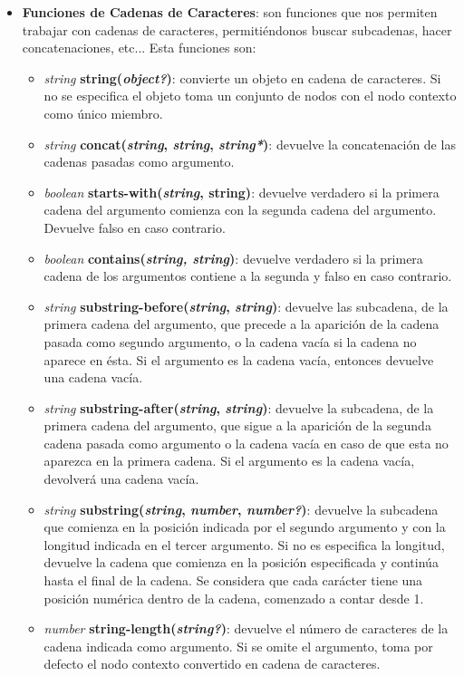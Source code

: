 \begin{itemize}
    \item \textbf{Funciones de Cadenas de Caracteres}: son funciones que nos permiten trabajar con cadenas de caracteres, permitiéndonos buscar subcadenas, hacer concatenaciones, etc... Esta funciones son:
    \begin{itemize}
        \item \textit{string} \textbf{string(\textit{object?})}: convierte un objeto en cadena de caracteres. Si no se especifica el objeto toma un conjunto de nodos con el nodo contexto como único miembro.
        \item \textit{string} \textbf{concat(\textit{string}, \textit{string}, \textit{string*})}: devuelve la concatenación de las cadenas pasadas como argumento.
        \item \textit{boolean} \textbf{starts-with(\textit{string}, string)}: devuelve verdadero si la primera cadena del argumento comienza con la segunda cadena del argumento. Devuelve falso en caso contrario.
        \item \textit{boolean} \textbf{contains(\textit{string, string})}: devuelve verdadero si la primera cadena de los argumentos contiene a la segunda y falso en caso contrario.
        \item \textit{string} \textbf{substring-before(\textit{string}, \textit{string})}: devuelve las subcadena, de la primera cadena del argumento, que precede a la aparición de la cadena pasada como segundo argumento, o la cadena vacía si la cadena no aparece en ésta. Si el argumento es la cadena vacía, entonces devuelve una cadena vacía.
        \item \textit{string} \textbf{substring-after(\textit{string}, \textit{string})}: devuelve la subcadena, de la primera cadena del argumento, que sigue a la aparición de la segunda cadena pasada como argumento o la cadena vacía en caso de que esta no aparezca en la primera cadena. Si el argumento es la cadena vacía, devolverá una cadena vacía.
        \item \textit{string} \textbf{substring(\textit{string}, \textit{number}, \textit{number?})}: devuelve la subcadena que comienza en la posición indicada por el segundo argumento y con la longitud indicada en el tercer argumento. Si no es especifica la longitud, devuelve la cadena que comienza en la posición especificada y continúa hasta el final de la cadena. Se considera que cada carácter tiene una posición numérica dentro de la cadena, comenzado a contar desde 1.
        \item \textit{number} \textbf{string-length(\textit{string?})}: devuelve el número de caracteres de la cadena indicada como argumento. Si se omite el argumento, toma por defecto el nodo contexto convertido en cadena de caracteres.

\end{itemize}
\end{itemize}
